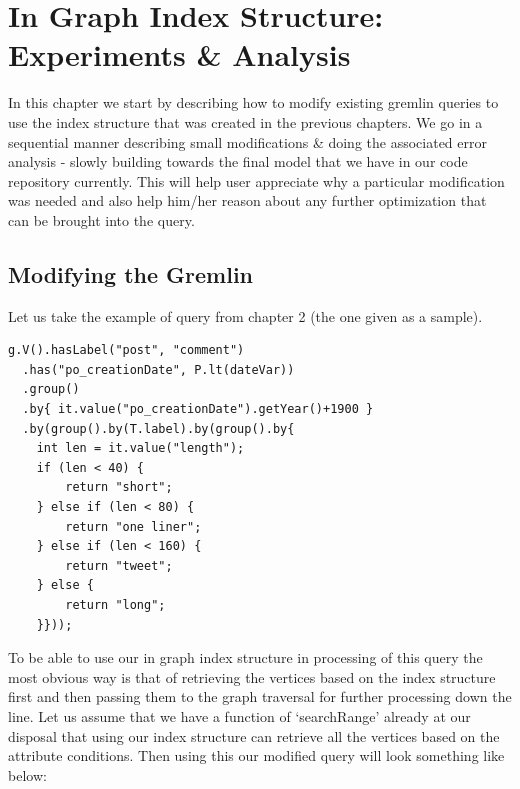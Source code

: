 
\chapter{In Graph Index Structure: Experiments \& Analysis} %

\label{Chapter 5} %

In this chapter we start by describing how to modify existing gremlin queries to use the index structure that was created in the previous chapters. We go in a sequential manner describing small modifications \& doing the associated error analysis - slowly building towards the final model that we have in our code repository currently. This will help user appreciate why a particular modification was needed and also help him/her reason about any further optimization that can be brought into the query.

\section{Modifying the Gremlin}

Let us take the example of query from chapter 2 (the one given as a sample).

\begin{lstlisting}
g.V().hasLabel("post", "comment")
  .has("po_creationDate", P.lt(dateVar))
  .group()
  .by{ it.value("po_creationDate").getYear()+1900 }
  .by(group().by(T.label).by(group().by{
    int len = it.value("length");
    if (len < 40) {
        return "short";
    } else if (len < 80) {
        return "one liner";
    } else if (len < 160) {
        return "tweet";
    } else {
        return "long";
    }}));
\end{lstlisting}
To be able to use our in graph index structure in processing of this query the most obvious way is that of retrieving the vertices based on the index structure first and then passing them to the graph traversal for further processing down the line. Let us assume that we have a function of `searchRange' already at our disposal that using our index structure can retrieve all the vertices based on the attribute conditions. Then using this our modified query will look something like below:

